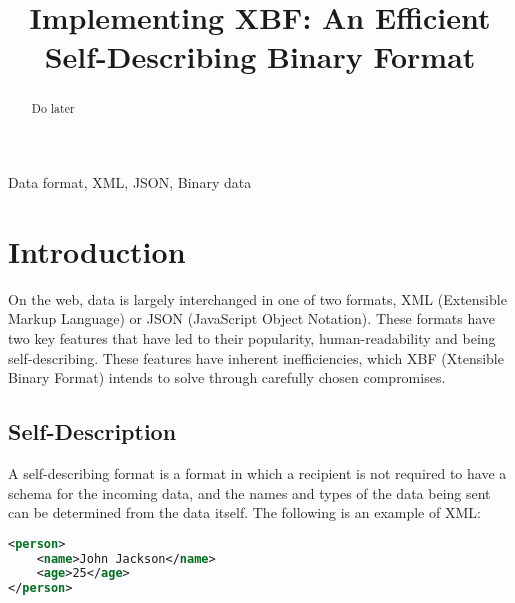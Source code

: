 \documentclass[conference]{IEEEtran}
\begin{document}
\title{Implementing XBF: An Efficient Self-Describing Binary Format}

\author{
	\and
}

\maketitle

\begin{abstract}
	Do later
\end{abstract}

\begin{IEEEkeywords}
	Data format, XML, JSON, Binary data
\end{IEEEkeywords}

\section{Introduction}

On the web, data is largely interchanged in one of two formats, XML (Extensible Markup Language)\cite{xml_spec} or JSON (JavaScript Object Notation)\cite{json_spec}. These formats have two key features that have led to their popularity, human-readability and being self-describing. These features have inherent inefficiencies, which XBF (Xtensible Binary Format)\cite{xbf_spec} intends to solve through carefully chosen compromises.

\subsection{Self-Description}

A self-describing format is a format in which a recipient is not required to have a schema for the incoming data, and the names and types of the data being sent can be determined from the data itself. The following is an example of XML:

\begin{lstlisting}[language=XML]
<person>
	<name>John Jackson</name>
	<age>25</age>
</person>
\end{lstlisting}
\end{document}
